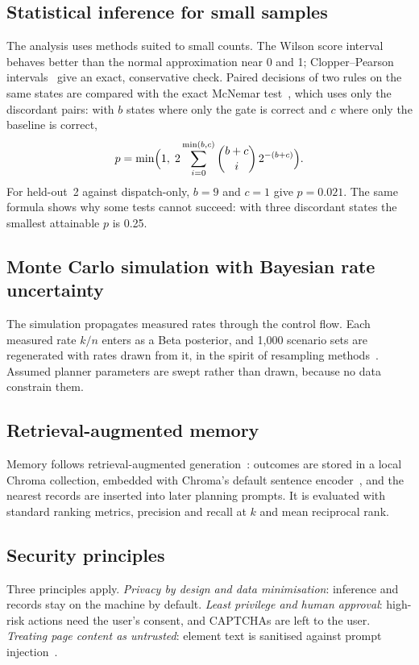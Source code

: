 \subsection{Statistical inference for small samples}
The analysis uses methods suited to small counts. The Wilson score interval~\cite{wilson1927probable} behaves better than the normal approximation near 0 and 1; Clopper--Pearson intervals~\cite{clopper1934use} give an exact, conservative check. Paired decisions of two rules on the same states are compared with the exact McNemar test~\cite{mcnemar1947note}, which uses only the discordant pairs: with $b$ states where only the gate is correct and $c$ where only the baseline is correct,
\begin{equation}
p = \min\Bigl(1,\; 2\sum_{i=0}^{\min(b,c)} \binom{b+c}{i}\,2^{-(b+c)}\Bigr).
\end{equation}
For held-out~2 against dispatch-only, $b=9$ and $c=1$ give $p=0.021$. The same formula shows why some tests cannot succeed: with three discordant states the smallest attainable $p$ is 0.25.

\subsection{Monte Carlo simulation with Bayesian rate uncertainty}
The simulation propagates measured rates through the control flow. Each measured rate $k/n$ enters as a Beta posterior, and 1{,}000 scenario sets are regenerated with rates drawn from it, in the spirit of resampling methods~\cite{efron1979bootstrap}. Assumed planner parameters are swept rather than drawn, because no data constrain them.

\subsection{Retrieval-augmented memory}
Memory follows retrieval-augmented generation~\cite{lewis2020rag}: outcomes are stored in a local Chroma collection, embedded with Chroma's default sentence encoder~\cite{reimers2019sbert}, and the nearest records are inserted into later planning prompts. It is evaluated with standard ranking metrics, precision and recall at $k$ and mean reciprocal rank.

\subsection{Security principles}
Three principles apply. \emph{Privacy by design and data minimisation}: inference and records stay on the machine by default. \emph{Least privilege and human approval}: high-risk actions need the user's consent, and CAPTCHAs are left to the user. \emph{Treating page content as untrusted}: element text is sanitised against prompt injection~\cite{greshake2023indirect,liu2024formalizing}.

